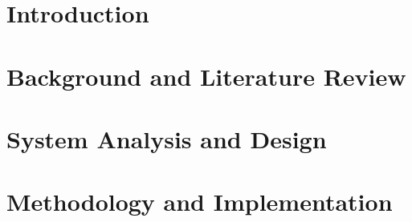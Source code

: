 \documentclass[12pt]{report}
\newcommand\blankpage{%
    \null
    \thispagestyle{empty}%
    \addtocounter{page}{-1}%
    \newpage}
\begin{document}
\renewcommand{\thepage}{\roman{page}}
\newcommand{\etal}{\textit{et al. }}






%









\tableofcontents

\setlength{\parskip}{0pt}

\listoffigures
{}
\listoftables


%





%




\clearpage
\setcounter{page}{1}
\setcounter{chapter}{0}
\renewcommand{\thepage}{\arabic{page}}	

\setlength{\parskip}{1em}
\chapter{Introduction}\label{cha:introduction}


\chapter{Background and Literature Review} \label{cha:LiteratureReviewU}


\chapter{System Analysis and Design} \label{cha:SystemAnalysisAndDesignU}


\chapter{Methodology and Implementation} 
\label{cha:MethodologyAndImplementationU}

\end{document}
